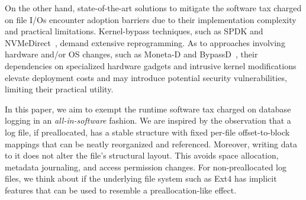 On the other hand,
state-of-the-art solutions to mitigate the software tax charged on file I/Os %
encounter  adoption barriers due to their implementation complexity and practical limitations. Kernel-bypass techniques, such as SPDK \cite{SSD:SPDK:CloudCom-2017} and NVMeDirect~\cite{SSD:NVMeDirect:HotStorage-2016}, demand extensive reprogramming. %
As to approaches involving hardware and/or OS changes, such as Moneta-D \cite{SSD:Moneta-D:ASPLOS-2012} and BypassD~\cite{SSD:BypassD:ASPLOS-2024}, 
their dependencies on   specialized hardware gadgets and intrusive kernel modifications %
elevate deployment costs and may introduce potential security vulnerabilities,   limiting their practical utility.

In this paper, we aim to exempt the runtime software tax charged on %
database logging %
in an {\em all-in-software} fashion. We are inspired by the observation that a 
 log file, if preallocated, has a stable structure with fixed per-file offset-to-block mappings 
 that can be neatly reorganized and referenced. Moreover, %
 writing data to it
  does not alter the file's structural layout. This avoids space  allocation, metadata journaling, 
and access permission changes. 
For non-preallocated log files, we think about if the underlying file system such as Ext4 has implicit 
features that can be used to resemble a preallocation-like effect.



